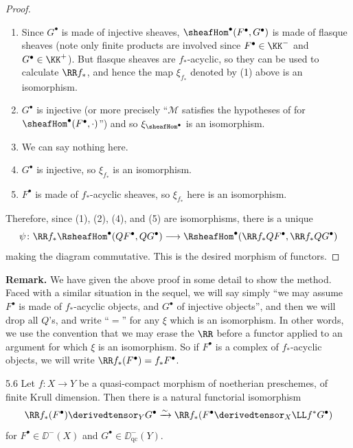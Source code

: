 \begin{proof}
\begin{enumerate}
\item[(1)] Since $G^\bullet$ is made of injective sheaves, $\sheafHom^\bullet(F^\bullet,G^\bullet)$ is made of flasque sheaves \cite[\nopp II,~7.3.2]{G} (note only finite products are involved since $F^\bullet\in\KK^-$ and $G^\bullet\in\KK^+$). But flasque sheaves are $f_*$-acyclic, so they can be used to calculate $\RR f_*$, and hence the map $\xi_{f_*}$ denoted by (1) above is an isomorphism.
\item[(2)] $G^\bullet$ is injective (or more precisely ``$\mathcal{M}$ satisfies the hypotheses of  for $\sheafHom^\bullet(F^\bullet,\cdot)$'') and so $\xi_{\sheafHom^\bullet}$ is an isomorphism.
\item[(3)] We can say nothing here.
\item[(4)] $G^\bullet$ is injective, so $\xi_{f_*}$ is an isomorphism.
\item[(5)] $F^\bullet$ is made of $f_*$-acyclic sheaves, so $\xi_{f_*}$ here is an isomorphism.
\end{enumerate}

Therefore, since (1), (2), (4), and (5) are isomorphisms, there is a unique
\[
\psi\colon \RR f_* \RsheafHom^\bullet(QF^\bullet,QG^\bullet) \longrightarrow \RsheafHom^\bullet(\RR f_*QF^\bullet, \RR f_*QG^\bullet)
\]
making the diagram commutative. This is the desired morphism of functors.
\end{proof}

\textbf{Remark.}
We have given the above proof in some detail to show the method. Faced with a similar situation in the sequel, we will say simply ``we may assume $F^\bullet$ is made of $f_*$-acyclic objects, and $G^\bullet$ of injective objects'', and then we will drop all $Q$'s, and write ``$=$'' for any $\xi$ which is an isomorphism. In other words, we use the convention that we may erase the $\RR$ before a functor applied to an argument for which $\xi$ is an isomorphism. So if $F^\bullet$ is a complex of $f_*$-acyclic objects, we will write $\RR f_*(F^\bullet)=f_*F^\bullet$.

\begin{bookproposition}{5.6}\label{prop:2.5.6}
Let $f\colon X\to Y$ be a quasi-compact morphism of noetherian preschemes, of finite Krull dimension. Then there is a natural functorial isomorphism
\[
\RR f_*(F^\bullet) \derivedtensor_Y G^\bullet \xrightarrow{\sim} \RR f_*(F^\bullet \derivedtensor_X \LL f^*G^\bullet)
\]
for $F^\bullet\in\DD^-(X)$ and $G^\bullet\in\DD_{\mathrm{qc}}^-(Y)$.
\end{bookproposition}

